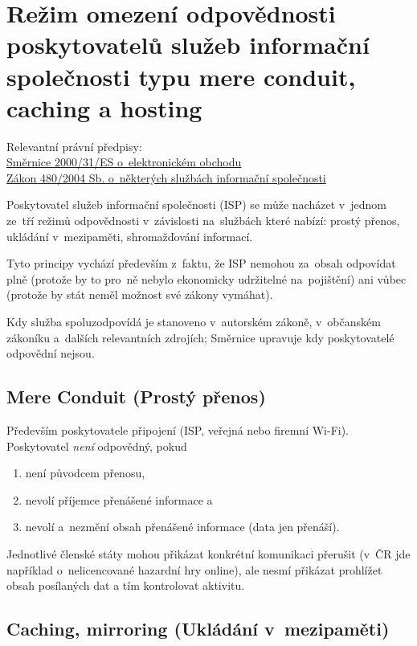 \section{Režim omezení odpovědnosti poskytovatelů služeb informační společnosti typu mere conduit, caching a hosting}

{}Relevantní právní předpisy:
\\\href{https://eur-lex.europa.eu/legal-content/CS/ALL/?uri=CELEX:32000L0031
}{Směrnice 2000/31/ES o~elektronickém obchodu}
\\\href{https://www.zakonyprolidi.cz/cs/2004-480}{Zákon 480/2004 Sb. o~některých službách informační společnosti}

Poskytovatel služeb informační společnosti (ISP) se může nacházet v~jednom ze~tří režimů odpovědnosti v~závislosti na~službách které nabízí: prostý přenos, ukládání v~mezipaměti, shromažďování informací.

Tyto principy vychází především z~faktu, že ISP nemohou za~obsah odpovídat plně (protože by to pro~ně nebylo ekonomicky udržitelné na~pojištění) ani vůbec (protože by stát neměl možnost své zákony vymáhat).

Kdy služba spoluzodpovídá je stanoveno v~autorském zákoně, v~občanském zákoníku a~dalších relevantních zdrojích; Směrnice upravuje kdy poskytovatelé odpovědní nejsou.


\subsection{Mere Conduit (Prostý přenos)}

Především poskytovatele připojení (ISP, veřejná nebo firemní Wi-Fi).
Poskytovatel \emph{není} odpovědný, pokud
\begin{enumerate}[label=\alph*)]
\item není původcem přenosu,
\item nevolí příjemce přenášené informace a
\item nevolí a~nezmění obsah přenášené informace (data jen přenáší).
\end{enumerate}

Jednotlivé členské státy mohou přikázat konkrétní komunikaci přerušit (v~ČR jde například o~nelicencované hazardní hry online), ale nesmí přikázat prohlížet obsah posílaných dat a tím kontrolovat aktivitu.

\subsection{Caching, mirroring (Ukládání v~mezipaměti)}

